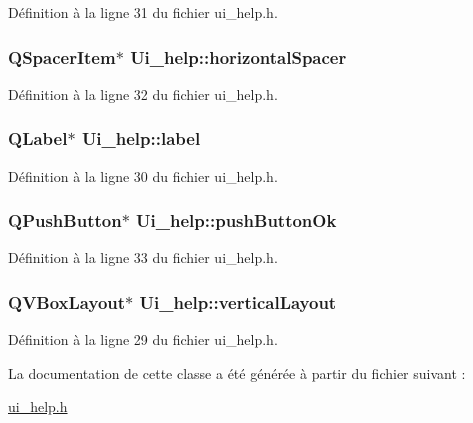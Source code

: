 Définition à la ligne 31 du fichier ui\-\_\-help.\-h.

\hypertarget{class_ui__help_a417e3c081fd384c5c48d0c6b5a4046ce}{
\subsubsection[{horizontal\-Spacer}]{\setlength{\rightskip}{0pt plus 5cm}Q\-Spacer\-Item$\ast$ Ui\-\_\-help\-::horizontal\-Spacer}}\label{class_ui__help_a417e3c081fd384c5c48d0c6b5a4046ce}


Définition à la ligne 32 du fichier ui\-\_\-help.\-h.

\hypertarget{class_ui__help_af99c4c1b7bfbb43884cd3596f02528b3}{
\subsubsection[{label}]{\setlength{\rightskip}{0pt plus 5cm}Q\-Label$\ast$ Ui\-\_\-help\-::label}}\label{class_ui__help_af99c4c1b7bfbb43884cd3596f02528b3}


Définition à la ligne 30 du fichier ui\-\_\-help.\-h.

\hypertarget{class_ui__help_a983ef178586664d76676080244d903b2}{
\subsubsection[{push\-Button\-Ok}]{\setlength{\rightskip}{0pt plus 5cm}Q\-Push\-Button$\ast$ Ui\-\_\-help\-::push\-Button\-Ok}}\label{class_ui__help_a983ef178586664d76676080244d903b2}


Définition à la ligne 33 du fichier ui\-\_\-help.\-h.

\hypertarget{class_ui__help_ac1a3b742bcbdbc9e70a5e6e08adbb4e8}{
\subsubsection[{vertical\-Layout}]{\setlength{\rightskip}{0pt plus 5cm}Q\-V\-Box\-Layout$\ast$ Ui\-\_\-help\-::vertical\-Layout}}\label{class_ui__help_ac1a3b742bcbdbc9e70a5e6e08adbb4e8}


Définition à la ligne 29 du fichier ui\-\_\-help.\-h.



La documentation de cette classe a été générée à partir du fichier suivant \-:\begin{DoxyCompactItemize}
\item 
\hyperlink{ui__help_8h}{ui\-\_\-help.\-h}\end{DoxyCompactItemize}
